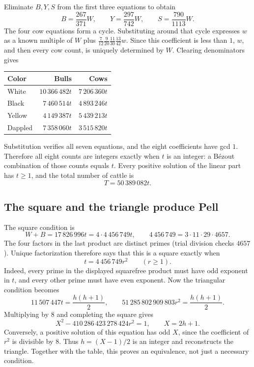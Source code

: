 Eliminate $B,Y,S$ from the first three equations to obtain
\[
 B=\frac{267}{371}W,\qquad
 Y=\frac{297}{742}W,\qquad
 S=\frac{790}{1113}W.
\]
The four cow equations form a cycle. Substituting around that cycle
expresses $w$ as a known multiple of $W$ plus
$\frac7{12}\frac9{20}\frac{11}{30}\frac{13}{42}w$.
Since this coefficient is less than $1$, $w$, and then every cow count,
is uniquely determined by $W$. Clearing denominators gives
\begin{center}
\begin{tabular}{lrr}
\toprule
Color & Bulls & Cows\\
\midrule
White   & $10\,366\,482t$ & $7\,206\,360t$\\
Black   & $7\,460\,514t$  & $4\,893\,246t$\\
Yellow  & $4\,149\,387t$  & $5\,439\,213t$\\
Dappled & $7\,358\,060t$  & $3\,515\,820t$\\
\bottomrule
\end{tabular}
\end{center}
Substitution verifies all seven equations, and the eight coefficients
have gcd $1$. Therefore all eight counts are integers exactly when
$t$ is an integer: a B\'ezout combination of those counts equals $t$.
Every positive solution of the linear part has $t\ge1$, and the total
number of cattle is
\begin{equation}\label{eq:cattle-total-scale}
 T=50\,389\,082t.
\end{equation}

\subsection*{The square and the triangle produce Pell}
The square condition is
\[
 W+B=17\,826\,996t
 =4\cdot4\,456\,749t,
 \qquad4\,456\,749=3\cdot11\cdot29\cdot4657.
\]
The four factors in the last product are distinct primes (trial division
checks $4657$). Unique factorization therefore says that this is a square
exactly when
\[
 t=4\,456\,749r^2\qquad(r\ge1).
\]
Indeed, every prime in the displayed squarefree product must have odd
exponent in $t$, and every other prime must have even exponent.
Now the triangular condition becomes
\[
 11\,507\,447t=\frac{h(h+1)}2,
 \qquad
 51\,285\,802\,909\,803r^2=\frac{h(h+1)}2.
\]
Multiplying by $8$ and completing the square gives
\begin{equation}\label{eq:cattle-large-pell}
 \boxed{\quad X^2-410\,286\,423\,278\,424r^2=1,
 \qquad X=2h+1.\quad}
\end{equation}
Conversely, a positive solution of this equation has odd $X$, since the
coefficient of $r^2$ is divisible by $8$. Thus $h=(X-1)/2$ is an integer
and reconstructs the triangle. Together with the table, this proves an
equivalence, not just a necessary condition.

